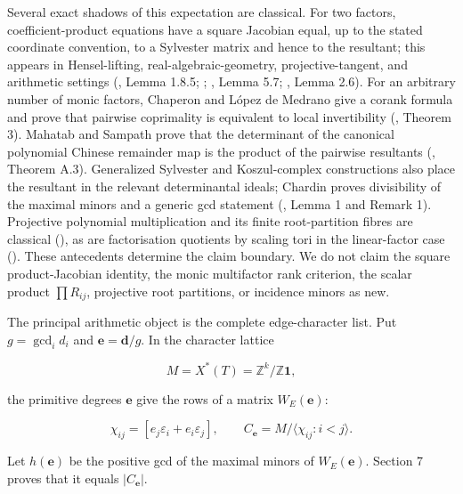 \documentclass[
  11pt,
  a4paper,
]{article}
\begin{document}
Several exact shadows of this expectation are classical. For two
factors, coefficient-product equations have a square Jacobian equal, up
to the stated coordinate convention, to a Sylvester matrix and hence to
the resultant; this appears in Hensel-lifting, real-algebraic-geometry,
projective-tangent, and arithmetic settings
(, Lemma 1.8.5;
;
, Lemma 5.7;
,
Lemma 2.6). For an arbitrary number of monic factors, Chaperon and López
de Medrano give a corank formula and prove that pairwise coprimality is
equivalent to local invertibility
(, Theorem 3). Mahatab and Sampath prove that the determinant of the
canonical polynomial Chinese remainder map is the product of the
pairwise resultants (, Theorem A.3). Generalized Sylvester and Koszul-complex
constructions also place the resultant in the relevant determinantal
ideals; Chardin proves divisibility of the maximal minors and a generic
gcd statement (, Lemma
1 and Remark 1). Projective polynomial multiplication and its finite
root-partition fibres are classical
(), as are
factorisation quotients by scaling tori in the linear-factor case
(). These antecedents determine the
claim boundary. We do not claim the square product-Jacobian identity,
the monic multifactor rank criterion, the scalar product
\(\prod R_{ij}\), projective root partitions, or incidence minors as
new.

The principal arithmetic object is the complete edge-character list. Put
\(g=\gcd_i d_i\) and \(\mathbf e=\mathbf d/g\). In the character lattice

\[
 M=X^*(T)=\mathbb Z^k/\mathbb Z\mathbf1,
\]

the primitive degrees \(\mathbf e\) give the rows of a matrix
\(W_E(\mathbf e)\):

\[
 \chi_{ij}=[e_j\varepsilon_i+e_i\varepsilon_j],\qquad
 C_{\mathbf e}=M/\langle\chi_{ij}:i<j\rangle.
\]

Let \(h(\mathbf e)\) be the positive gcd of the maximal minors of
\(W_E(\mathbf e)\). Section 7 proves that it equals \(|C_{\mathbf e}|\).
\end{document}
